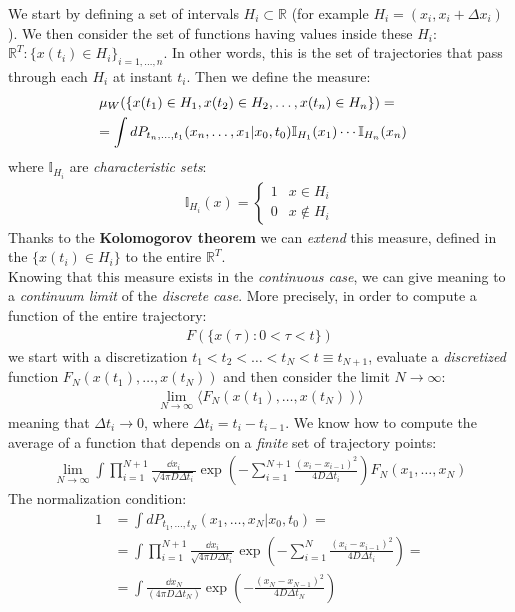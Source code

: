 \documentclass[../template.tex]{subfiles}
\begin{document}
We start by defining a set of intervals $H_i \subset \mathbb{R}$ (for example $H_i = (x_i, x_i + \Delta x_i)$). We then consider the set of functions having values inside these $H_i$: $\mathbb{R}^T\colon \{x(t_i) \in H_i\}_{i=1, \dots, n}$. In other words, this is the set of trajectories that pass through each $H_i$ at instant $t_i$. Then we define the measure:
\begin{align*}
    \mu_W(\{x(t_1) \in H_1, x(t_2) \in H_2, \dots, x(t_n) \in H_n\}) = \\
    = \int dP_{t_n, \dots, t_1}(x_n, \dots, x_1|x_0, t_0) \bb{I}_{H_1}(x_1) \cdots \mathbb{I}_{H_n}(x_n)\span 
\end{align*} 
where $\mathbb{I}_{H_i}$ are \textit{characteristic sets}:
\begin{align*}
    \mathbb{I}_{H_i} (x) = \begin{cases}
        1 & x \in H_i\\
        0 & x \not\in H_i
    \end{cases}
\end{align*}  
Thanks to the \textbf{Kolomogorov theorem} we can \textit{extend} this measure, defined in the  $\{x(t_i) \in H_i\}$ to the entire $\mathbb{R}^T$.\\
Knowing that this measure exists in the \textit{continuous case}, we can give meaning to a \textit{continuum limit} of the \textit{discrete case}. More precisely, in order to compute a function of the entire trajectory:
\begin{align*}
    F(\{x(\tau)\colon 0 < \tau < t \})
\end{align*}    
we start with a discretization $t_1 < t_2 < \dots < t_N < t \equiv t_{N+1}$, evaluate a \textit{discretized} function $F_N(x(t_1), \dots, x(t_N))$ and then consider the limit $N \to \infty$:
\begin{align*}
    \lim_{N \to \infty} \langle F_N(x(t_1), \dots, x(t_N)) \rangle
\end{align*}     
meaning that $\Delta t_i \to 0$, where $\Delta t_i = t_i - t_{i-1}$. We know how to compute the average of a function that depends on a \textit{finite} set of trajectory points: 
\begin{align*}
    \lim_{N \to \infty} \int \prod_{i=1}^{N+1} \frac{\dd{x_i}}{\sqrt{4\pi D \Delta t_i}} \exp\left(-\sum_{i=1}^{N+1} \frac{(x_i - x_{i-1})^2}{4 D \Delta t_i} \right) F_N(x_1, \dots, x_N) 
\end{align*}  
The normalization condition:
\begin{align*}
    1 &= \int dP_{t_1, \dots, t_N} (x_1, \dots, x_N| x_0, t_0) = \\
&= \int \prod_{i=1}^{N+1} \frac{\dd{x_i}}{\sqrt{4 \pi D \Delta t_i}} \exp\left(-\sum_{i=1}^{N} \frac{(x_i - x_{i-1})^2}{4 D \Delta t_i} \right) = \\
&= \int \frac{\dd{x_N}}{(4 \pi D \Delta t_N )} \exp\left(-\frac{(x_N - x_{N-1})^2}{4 D \Delta t_N} \right)  
\end{align*}
\end{document}
